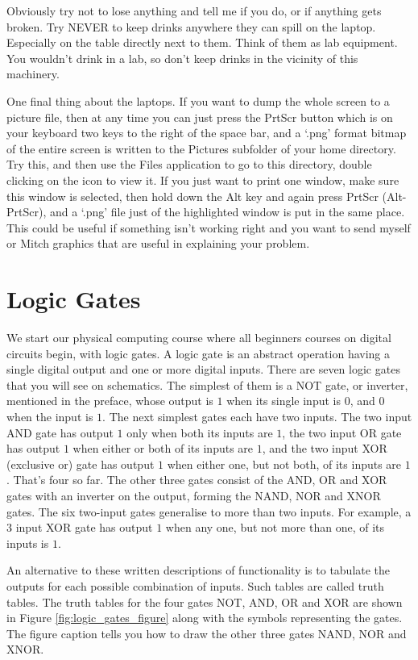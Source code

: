 \documentclass[../physical_computing.tex]{subfiles}
\begin{document}
Obviously try not to lose anything and tell me if you do, or if anything gets broken. Try NEVER to keep drinks anywhere they can spill on the laptop. Especially on the table directly next to them. Think of them as lab equipment. You wouldn't drink in a lab, so don't keep drinks in the vicinity of this machinery.

One final thing about the laptops. If you want to dump the whole screen to a picture file, then at any time you can just press the PrtScr button which is on your keyboard two keys to the right of the space bar, and a `.png' format bitmap of the entire screen is written to the Pictures subfolder of your home directory. Try this, and then use the Files application to go to this directory, double clicking on the icon to view it. If you just want to print one window, make sure this window is selected, then hold down the Alt key and again press PrtScr (Alt-PrtScr), and a `.png' file just of the highlighted window is put in the same place. This could be useful if something isn't working right and you want to send myself or Mitch graphics that are useful in explaining your problem.

\section{Logic Gates}
\label{sec:logicgates}

We start our physical computing course where all beginners courses on digital circuits begin, with logic gates.
A logic gate is an abstract operation having a single digital output and one or more digital inputs. There are seven
logic gates that you will see on schematics. The simplest of them is a NOT gate, or inverter, mentioned in the preface,
whose output is $1$ when its single input is $0$, and $0$ when the input is $1$. The next simplest gates each have two inputs. The two input AND gate has output $1$ only when both its inputs are $1$, the two input OR gate has output $1$ when either or both of its inputs are $1$, and the two input XOR (exclusive or) gate has output $1$ when either one, but not both, of its inputs are $1$. That's four so far. The other three gates consist of the AND, OR and XOR gates with an inverter on the output, forming the NAND, NOR and XNOR gates. The six two-input gates generalise to more than two inputs. For example, a 3 input XOR gate has output $1$ when any one, but not more than one, of its inputs is $1$.

An alternative to these written descriptions of functionality is to tabulate the outputs for each possible combination of inputs. Such tables are called truth tables. The truth tables for the four gates NOT, AND, OR and XOR are shown in Figure \ref{fig:logic_gates_figure}
along with the symbols representing the gates. The figure caption tells you how to draw the other three gates NAND, NOR and XNOR. 
\end{document}
